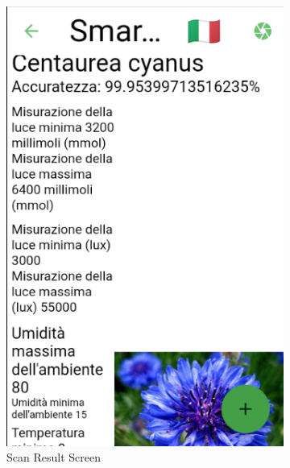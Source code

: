 \documentclass[a4paper,12pt]{report}
\begin{document}
\begin{figure}[H]
	
	\begin{subfigure}{0.3\textwidth} %
		\includegraphics[width=\textwidth]{./images/scan_result/scan_result_screen.png}
		\caption{Scan Result Screen}
		\label{fig:scan_result}
	\end{subfigure}
	\hfill
	\begin{subfigure}{0.3\textwidth}

\end{subfigure}
\end{figure}
\end{document}
